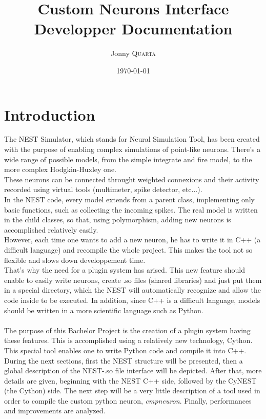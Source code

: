 \documentclass{article}
\title{Custom Neurons Interface\\Developper Documentation} %
\author{Jonny \textsc{Quarta}} %
\date{\today} %
\begin{document}
\maketitle %


\setlength\parindent{0pt} %

\renewcommand{\labelenumi}{\alph{enumi}.} %

\section{Introduction}
The NEST Simulator, which stands for Neural Simulation Tool, has been created with the purpose of enabling complex simulations of point-like neurons. There's a wide range of possible models, from the simple integrate and fire model, to the more complex Hodgkin-Huxley one.\\
These neurons can be connected throught weighted connexions and their activity recorded using virtual tools (multimeter, spike detector, etc...).\\

In the NEST code, every model extends from a parent class, implementing only basic functions, such as collecting the incoming spikes. The real model is written in the child classes, so that, using polymorphism, adding new neurons is accomplished relatively easily.\\
However, each time one wants to add a new neuron, he has to write it in C++ (a difficult language) and recompile the whole project. This makes the tool not so flexible and slows down developpement time.\\
That's why the need for a plugin system has arised. This new feature should enable to easily write neurons, create .so files (shared libraries) and just put them in a special directory, which the NEST will automatically recognize and allow the code inside to be executed. In addition, since C++ is a difficult language, models should be written in a more scientific language such as Python.\\ \\
The purpose of this Bachelor Project is the creation of a plugin system having these features. This is accomplished using a relatively new technology, Cython. This special tool enables one to write Python code and compile it into C++.\\
During the next sections, first the NEST structure will be presented, then a global description of the NEST-.so file interface will be depicted. After that, more details are given, beginning with the NEST C++ side, followed by the CyNEST (the Cython) side. The next step will be a very little description of a tool used in order to compile the custom python neuron, \emph{cmpneuron}. Finally, performances and improvements are analyzed.
\end{document}
